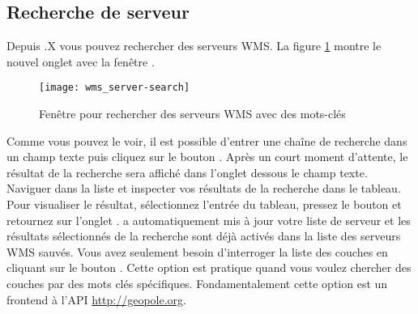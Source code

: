 % 
%
\subsection{Recherche de serveur}
\label{sec:serversearch}

Depuis .X vous pouvez rechercher des serveurs WMS. 
La figure \ref{fig:searchtab} montre le nouvel onglet  avec la fenêtre 
.

\begin{figure}[ht]
  \begin{center}
	\texttt{[image: wms\_server-search]}
	\caption{Fenêtre pour rechercher des serveurs WMS avec des mots-clés \nixcaption}\label{fig:searchtab}
  \end{center}
\end{figure}

Comme vous pouvez le voir, il est possible d'entrer une chaîne de recherche dans un champ texte puis cliquez sur le bouton .
Après un court moment d'attente, le résultat de la recherche sera affiché dans l'onglet dessous le champ texte.
Naviguer dans la liste et inspecter vos résultats de la recherche dans le tableau. Pour visualiser le résultat, sélectionnez l'entrée du tableau, pressez le bouton  et retournez sur l'onglet .
\qg a automatiquement mis à jour votre liste de serveur et les résultats sélectionnés de la recherche sont déjà activés dans la liste des serveurs WMS sauvés.
Vous avez seulement besoin d'interroger la liste des couches en cliquant sur le bouton .
Cette option est pratique quand vous voulez chercher des couches par des mots clés spécifiques.
Fondamentalement cette option est un frontend à l'API \url{http://geopole.org}.

